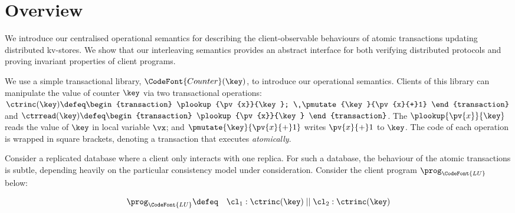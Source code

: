 \section{Overview}
\label{sec:overview}

We introduce our centralised operational semantics for describing the
client-observable behaviours of atomic transactions updating  distributed
kv-stores. We show that our interleaving semantics provides 
an abstract interface for both verifying distributed protocols 
and proving invariant properties of client programs.

 We use a simple transactional library, \(\CodeFont{Counter}(\key)\), to
 introduce our operational semantics.  Clients of this library can manipulate the
value of counter \(\key\) via two transactional operations:
\( 
\ctrinc(\key) \defeq 
\begin{transaction}
\plookup{\pv{x}}{\key}; \ 
\pmutate{\key}{\pv{x}{+}1}
\end{transaction}
\)
and
\(
\ctrread(\key) \defeq
\begin{transaction}
\plookup{\pv{x}}{\key}
\end{transaction}
\).
The \( \plookup{\pv{x}}{\key} \) reads the value of \( \key \) in
local variable \( \vx \); and \( \pmutate{\key}{\pv{x}{+}1} \)
writes \( \pv{x}{+}1 \) to \( \key \).  The code of each
operation is wrapped in square brackets, denoting a transaction that 
executes \emph{atomically}.  

Consider a replicated database where a client only interacts with one
replica.
For such a database, the behaviour of the atomic transactions is subtle, 
depending heavily on the particular consistency model under consideration.  
Consider the client program $\prog_{\CodeFont{LU}}$ below:

\SpaceAboveMath
\[ 
\prog_{\CodeFont{LU}} \defeq \quad \cl_1 : \ctrinc(\key) \;|| \; \cl_2: \ctrinc(\key) 
\]
\SpaceBelowMath

